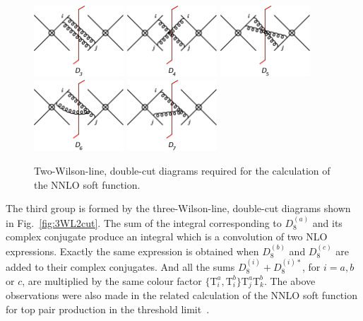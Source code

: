 \documentclass[a4paper,11pt]{article}
\def\cT{\bm{\mathrm{T}}}
\numberwithin{equation}{section}
\begin{document}
\begin{figure}[t]
  \begin{center}
    \includegraphics[width=0.30\textwidth]{plots/sf-nnlo-2cut.png}
    \hfill
    \includegraphics[width=0.30\textwidth]{plots/sf-nnlo-d4.png}
    \hfill
    \includegraphics[width=0.30\textwidth]{plots/sf-nnlo-d5.png}
    \hfill
    \includegraphics[width=0.30\textwidth]{plots/sf-nnlo-d6.png}
    \hspace{30pt}
    \includegraphics[width=0.30\textwidth]{plots/sf-nnlo-3gv.png}
  \end{center}
  \caption{Two-Wilson-line, double-cut diagrams required for the calculation of
  the NNLO soft function.
  }
  \label{fig:2WL2cut}
\end{figure}

The third group is formed by the three-Wilson-line, double-cut  diagrams shown
in Fig.~\ref{fig:3WL2cut}. 
%
The sum of the integral corresponding to $D^{(a)}_8$ and
its complex conjugate produce an integral which is a convolution of two NLO
expressions. Exactly the same expression is obtained when $D^{(b)}_8$ and
$D^{(c)}_8$ are added to their complex conjugates. And all the sums 
$D^{(i)}_8 + D^{(i)*}_8 $, for $i = a,b$ or $c$, are multiplied by the same colour factor
 $\{\cT_i^a, \cT_i^b\} \cT_j^a \cT_k^b$. 
%
The above observations were also made in the related calculation of the NNLO
soft function for top pair production in the threshold
limit~\cite{Ferroglia:2012uy, Wang:2018vgu}.
\end{document}
